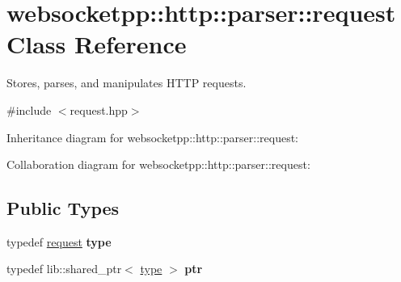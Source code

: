 \hypertarget{classwebsocketpp_1_1http_1_1parser_1_1request}{}\section{websocketpp\+:\+:http\+:\+:parser\+:\+:request Class Reference}
\label{classwebsocketpp_1_1http_1_1parser_1_1request}


Stores, parses, and manipulates H\+T\+TP requests.  




{\ttfamily \#include $<$request.\+hpp$>$}



Inheritance diagram for websocketpp\+:\+:http\+:\+:parser\+:\+:request\+:


Collaboration diagram for websocketpp\+:\+:http\+:\+:parser\+:\+:request\+:
\subsection*{Public Types}
\begin{DoxyCompactItemize}
\item 
\mbox{\label{classwebsocketpp_1_1http_1_1parser_1_1request_a456cf14e4c5fd1dab94910580042de6b}} 
typedef \mbox{\hyperlink{classwebsocketpp_1_1http_1_1parser_1_1request}{request}} {\bfseries type}
\item 
\mbox{\label{classwebsocketpp_1_1http_1_1parser_1_1request_aa9284144353524d93cedf6c053ac07cf}} 
typedef lib\+::shared\+\_\+ptr$<$ \mbox{\hyperlink{classwebsocketpp_1_1http_1_1parser_1_1request}{type}} $>$ {\bfseries ptr}
\end{DoxyCompactItemize}
